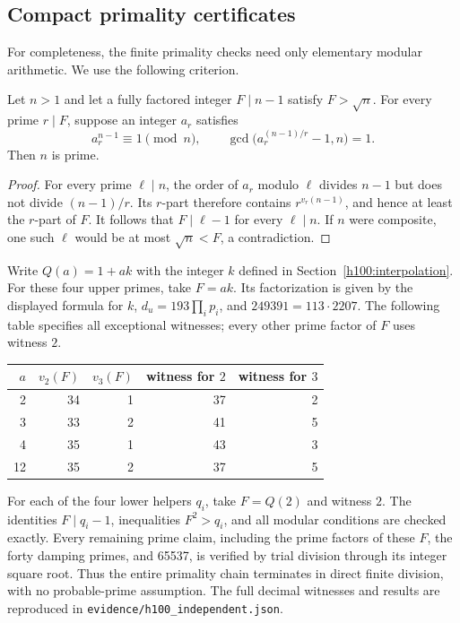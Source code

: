 \subsection{Compact primality certificates}
For completeness, the finite primality checks need only elementary modular
arithmetic. We use the following criterion.
\begin{lemma}
Let $n>1$ and let a fully factored integer $F\mid n-1$ satisfy $F>\sqrt n$.
For every prime $r\mid F$, suppose an integer $a_r$ satisfies
\[
 a_r^{n-1}\equiv1\pmod n,\qquad
 \gcd\bigl(a_r^{(n-1)/r}-1,n\bigr)=1.
\]
Then $n$ is prime.
\end{lemma}
\begin{proof}
For every prime $\ell\mid n$, the order of $a_r$ modulo $\ell$ divides
$n-1$ but does not divide $(n-1)/r$. Its $r$-part therefore contains
$r^{v_r(n-1)}$, and hence at least the $r$-part of $F$. It follows that
$F\mid\ell-1$ for every $\ell\mid n$. If $n$ were composite, one such
$\ell$ would be at most $\sqrt n<F$, a contradiction.
\end{proof}
Write $Q(a)=1+ak$ with the integer $k$ defined in
Section~\ref{h100:interpolation}. For these four upper primes, take
$F=ak$. Its factorization is given by the displayed formula for $k$,
$d_u=193\prod_i p_i$, and $249391=113\cdot2207$.
The following table specifies all exceptional witnesses; every other prime
factor of $F$ uses witness $2$.
\begin{center}\small
\begin{tabular}{rrrrr}\toprule
$a$ & $v_2(F)$ & $v_3(F)$ & witness for $2$ & witness for $3$\\\midrule
2 & 34 & 1 & 37 & 2\\
3 & 33 & 2 & 41 & 5\\
4 & 35 & 1 & 43 & 3\\
12 & 35 & 2 & 37 & 5\\\bottomrule
\end{tabular}\end{center}
For each of the four lower helpers $q_i$, take $F=Q(2)$ and witness $2$.
The identities $F\mid q_i-1$, inequalities $F^2>q_i$, and all modular
conditions are checked exactly. Every remaining prime claim, including the
prime factors of these $F$, the forty damping primes, and 65537, is verified
by trial division through its integer square root. Thus the entire primality
chain terminates in direct finite division, with no probable-prime assumption.
The full decimal witnesses and results are reproduced in
\texttt{evidence/h100\_independent.json}.

